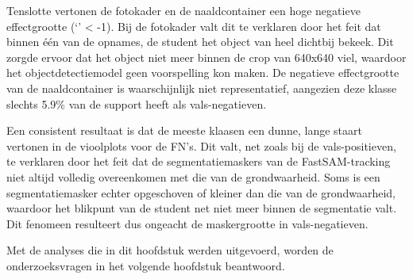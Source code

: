 Tenslotte vertonen de fotokader en de naaldcontainer een hoge negatieve effectgrootte (`' < -1).
Bij de fotokader valt dit te verklaren door het feit dat binnen één van de opnames, de student het object van heel dichtbij bekeek.
Dit zorgde ervoor dat het object niet meer binnen de crop van 640x640 viel, waardoor het objectdetectiemodel geen voorspelling kon maken.
De negatieve effectgrootte van de naaldcontainer is waarschijnlijk niet representatief, aangezien deze klasse slechts 5.9\% van de support heeft als vals-negatieven.

Een consistent resultaat is dat de meeste klaasen een dunne, lange staart vertonen in de vioolplots voor de FN's. 
Dit valt, net zoals bij de vals-positieven, te verklaren door het feit dat de segmentatiemaskers van de FastSAM-tracking niet altijd volledig overeenkomen met die van de grondwaarheid.
Soms is een segmentatiemasker echter opgeschoven of kleiner dan die van de grondwaarheid, waardoor het blikpunt van de student net niet meer binnen de segmentatie valt.
Dit fenomeen resulteert dus ongeacht de maskergrootte in vals-negatieven.

Met de analyses die in dit hoofdstuk werden uitgevoerd, worden de onderzoeksvragen in het volgende hoofdstuk beantwoord.
